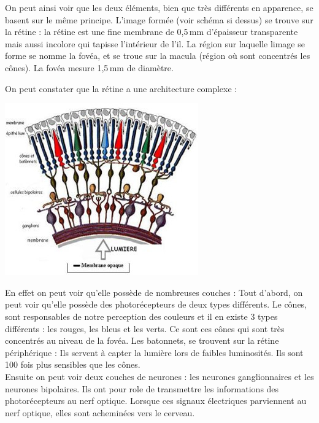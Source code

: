 \documentclass[12pt, a4paper]{report}
\begin{document}
On peut ainsi voir que les deux éléments, bien que très différents en apparence, se basent sur le même principe. L'image formée (voir schéma si dessus) se trouve sur la rétine : la rétine est une fine membrane de 0,5\,mm d'épaisseur transparente mais aussi incolore qui tapisse l'intérieur de l'il. La région sur laquelle limage se forme se nomme la fovéa, et se troue sur la macula (région où sont concentrés les cônes). La fovéa mesure 1,5\,mm de diamètre.

On peut constater que la rétine a une architecture complexe :


\begin{center}
\includegraphics[]{retine.jpg}
\end{center}









En effet on peut voir qu'elle possède de nombreuses couches : Tout d'abord, on peut voir qu'elle possède des photorécepteurs de deux types différents. Le cônes, sont responsables de notre perception des couleurs et il en existe 3 types différents : les rouges, les bleus et les verts. Ce sont ces cônes qui sont très concentrés au niveau de la fovéa. Les batonnets, se trouvent sur la rétine périphérique : Ils servent à capter la lumière lors de faibles luminosités. Ils sont 100 fois plus sensibles que les cônes.\\
Ensuite on peut voir deux couches de neurones : les neurones ganglionnaires et les neurones bipolaires. Ils ont pour role de transmettre les informations des photorécepteurs au nerf optique. Lorsque ces signaux électriques  parviennent au nerf optique, elles sont acheminées vers le cerveau.\\
\end{document}
